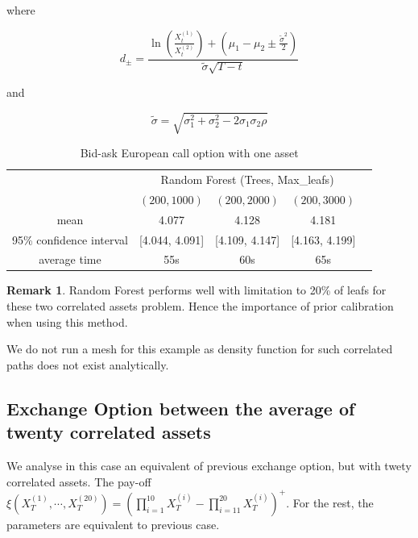 \documentclass[english,11pt,openany]{report}
\theoremstyle{definition}
\theoremstyle{plain}
\theoremstyle{definition}
\newtheorem{Rem}[Th]{Remark}
\begin{document}
where 

\begin{displaymath}
d_{\pm} = \frac{\ln\left(\frac{X^{(1)}_t}{X^{(2)}_t}\right) + (\mu_1 - \mu_2 \pm \frac{\tilde{\sigma}^2}{2} ) }{\tilde{\sigma}\sqrt{T-t}}
\end{displaymath}

and 

\begin{displaymath}
\tilde{\sigma} = \sqrt{\sigma_1^2  + \sigma_2^2 - 2\sigma_1\sigma_2 \rho}
\end{displaymath}

\begin{table}[H]
	\centering
	\caption{Bid-ask European call option with one asset}\label{table:eo}
	\begin{tabular}{*5c}
		\toprule
		& \multicolumn{3}{c}{Random Forest (Trees, Max\_leafs)} \\
		\cmidrule(lr){2-4}
		 & $(200, 1000)$ &  $(200, 2000)$ & $(200, 3000)$ \\
		\midrule
		mean &      4.077 &    4.128   & 4.181\\ 
		95\% confidence interval &  [4.044, 4.091]    & [4.109, 4.147] & [4.163, 4.199] \\
		average time &   55s & 60s & 65s \\
		\bottomrule
	\end{tabular}
\end{table}

\begin{Rem}
Random Forest performs well with limitation to 20\% of leafs for these two correlated assets problem. 
Hence the importance of prior calibration when using this method. 

We do not run a mesh for this example as density function for such correlated paths does not exist analytically.
\end{Rem}

\subsection{Exchange Option between the average of twenty correlated assets}

We analyse in this case an equivalent of previous exchange option, but with twety correlated assets. The pay-off $\xi(X^{(1)}_T, \cdots ,X^{(20)}_T) = \left(\prod_{i=1}^{10}X^{(i)}_T - \prod_{i=11}^{20}X^{(i)}_T\right)^+$. 
For the rest, the parameters are equivalent to previous case.
\end{document}
